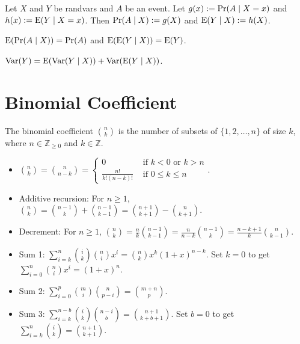 \documentclass[a4paper, 12pt, fleqn]{article}
\begin{document}
\begin{definition}
Let $X$ and $Y$ be randvars and $A$ be an event.
Let $g(x) := \Pr(A \mid X=x)$ and $h(x) := \operatorname*{E}(Y \mid X=x)$.
Then $\Pr(A \mid X) := g(X)$ and $\operatorname*{E}(Y \mid X) := h(X)$.
\end{definition}

\begin{theorem}
$\operatorname*{E}(\Pr(A \mid X)) = \Pr(A)$ and $\operatorname*{E}(\operatorname*{E}(Y \mid X)) = \operatorname*{E}(Y)$.
\end{theorem}

\begin{theorem}
$\operatorname*{Var}(Y) = \operatorname*{E}(\operatorname*{Var}(Y \mid X)) + \operatorname*{Var}(\operatorname*{E}(Y \mid X))$.
\end{theorem}

\section{Binomial Coefficient}

The binomial coefficient $\binom{n}{k}$ is the number of subsets of $\{1, 2, \ldots, n\}$ of size $k$,
where $n \in \mathbb{Z}_{\ge 0}$ and $k \in \mathbb{Z}$.

\begin{itemize}
\item $\displaystyle \binom{n}{k} = \binom{n}{n-k} = \begin{cases}
    0 & \textrm{ if } k < 0 \textrm{ or } k > n
    \\ \frac{n!}{k!(n-k)!} & \textrm{ if } 0 \le k \le n \end{cases}$.
\item Additive recursion: For $n \ge 1$, $\displaystyle \binom{n}{k}
    = \binom{n-1}{k} + \binom{n-1}{k-1}
    = \binom{n+1}{k+1} - \binom{n}{k+1}$.
\item Decrement: For $n \ge 1$, $\displaystyle \binom{n}{k}
    = \frac{n}{k} \binom{n-1}{k-1}
    = \frac{n}{n-k} \binom{n-1}{k}
    = \frac{n-k+1}{k} \binom{n}{k-1}$.
\item Sum 1: $\displaystyle \sum_{i=k}^n \binom{i}{k}\binom{n}{i}x^i = \binom{n}{k}x^k(1+x)^{n-k}$.
Set $k=0$ to get $\displaystyle \sum_{i=0}^n \binom{n}{i}x^i = (1+x)^n$.
\item Sum 2: $\displaystyle \sum_{i=0}^p \binom{m}{i}\binom{n}{p-i} = \binom{m+n}{p}$.
\item Sum 3: $\displaystyle \sum_{i=k}^{n-b} \binom{i}{k}\binom{n-i}{b} = \binom{n+1}{k+b+1}$.
Set $b=0$ to get $\displaystyle \sum_{i=k}^{n} \binom{i}{k} = \binom{n+1}{k+1}$.
\end{itemize}
\end{document}
